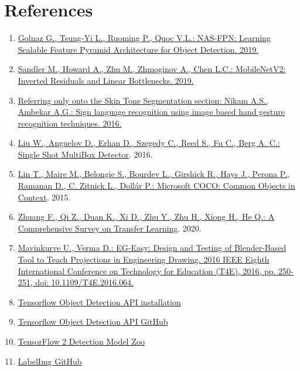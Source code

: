 \documentclass[a4paper, 12pt]{article}
\begin{document}
\section{References}
\label{References}
\begin{flushleft}
\begin{enumerate}
    \item \label{RefSSD} \href{https://arxiv.org/pdf/1904.07392}{Golnaz G., Tsung-Yi L., Ruoming P., Quoc V.L.: NAS-FPN: Learning Scalable Feature Pyramid Architecture for Object Detection. 2019.}
    \item \label{RefArchSSD} \href{https://arxiv.org/pdf/1801.04381.pdf}{Sandler M., Howard A., Zhu M., Zhmoginov A., Chen L.C.: MobileNetV2: Inverted Residuals and Linear Bottlenecks. 2019.}
    \item  \label{Ref0} \href{https://ieeexplore.ieee.org/document/7916786}{Referring only onto the Skin Tone Segmentation section: Nikam A.S., Ambekar A.G.: Sign language recognition using image based hand gesture recognition techniques. 2016.}
    \item \label{Ref1} \href{https://arxiv.org/abs/1512.02325}{Liu W., Anguelov D., Erhan D., Szegedy C., Reed S., Fu C., Berg A. C.: Single Shot MultiBox Detector}. 2016.
    \item \label{Ref2} \href{https://arxiv.org/abs/1405.0312}{Lin T., Maire M., Belongie S., Bourdev L., Girshick R., Hays J., Perona P., Ramanan D., C. Zitnick L., Dollár P.: Microsoft COCO: Common Objects in Context}. 2015.
    \item \label{Ref3} \href{https://arxiv.org/abs/1911.02685}{Zhuang F., Qi Z., Duan K., Xi D., Zhu Y., Zhu H., Xiong H., He Q.: A Comprehensive Survey on Transfer Learning}. 2020.
    \item \label{Ref4} \href{https://ieeexplore.ieee.org/document/7814839}{Mavinkurve U., Verma D.: EG-Easy: Design and Testing of Blender-Based Tool to Teach Projections in Engineering Drawing. 2016 IEEE Eighth International Conference on Technology for Education (T4E), 2016, pp. 250-251, doi: 10.1109/T4E.2016.064.}
    \item \label{Ref8} \href{https://tensorflow-object-detection-api-tutorial.readthedocs.io/en/latest/}{Tensorflow Object Detection API installation}
    \item \label{Ref9} \href{https://github.com/tensorflow/models/tree/master/research/object_detection}{Tensorflow Object Detection API GitHub}
    \item \label{Ref10} \href{https://github.com/tensorflow/models/blob/master/research/object_detection/g3doc/tf2_detection_zoo.md}{TensorFlow 2 Detection Model Zoo}
    \item \label{Ref11} \href{https://github.com/tzutalin/labelImg}{LabelImg GitHub}
\end{enumerate}
\end{flushleft}
\end{document}
